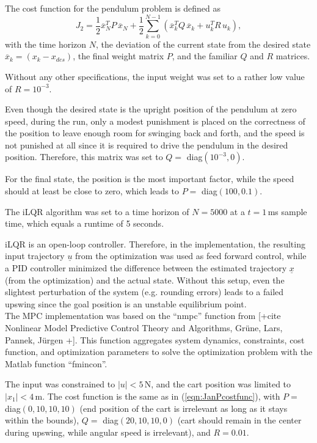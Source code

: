 \documentclass[letterpaper, 10 pt, conference]{ieeeconf}  %
\begin{document}
The cost function for the pendulum problem is defined as 
\begin{equation}\label{eqn:JanPcostfunc}
J_2 = \frac{1}{2}\overline{x}_N^{T}P\,\overline{x}_N + \frac{1}{2}\sum_{k=0}^{N-1}\left(\overline{x}_k^{T}Q\,\overline{x}_k + u_k^{T}R\,u_k\right),
\end{equation}
with the time horizon $N$, the deviation of the current state from the desired state $\overline{x}_k=(x_k-x_{des})$, the final weight matrix $P$, and the familiar $Q$ and $R$ matrices. 

Without any other specifications, the input weight was set to a rather low value of $R=10^{-3}$. 

Even though the desired state is the upright position of the pendulum at zero speed, during the run, only a modest punishment is placed on the correctness of the position to leave enough room for swinging back and forth, and the speed is not punished at all since it is required to drive the pendulum in the desired position. Therefore, this matrix was set to $Q=$ diag$(10^{-3},0)$.

For the final state, the position is the most important factor, while the speed should at least be close to zero, which leads to $P=$ diag$(100,0.1)$.

The iLQR algorithm was set to a time horizon of $N=5000$ at a $t=1$\,ms sample time, which equals a runtime of 5 seconds.

iLQR is an open-loop controller. Therefore, in the implementation, the resulting input trajectory $\underline{u}$ from the optimization was used as feed forward control, while a PID controller minimized the difference between the estimated trajectory $\underline{x}$ (from the optimization) and the actual state.
Without this setup, even the slightest perturbation of the system (e.g. rounding errors) leads to a failed upswing since the goal position is an unstable equilibrium point.\\

 

The MPC implementation was based on the ``nmpc'' function from [+cite Nonlinear Model Predictive Control Theory and Algorithms, Grüne, Lars, Pannek, Jürgen +]. This function aggregates system dynamics, constraints, cost function, and optimization parameters to solve the optimization problem with the Matlab function ``fmincon''.

The input was constrained to $|u|<5$\,N, and the cart position was limited to $|x_1|<4$\,m. The cost function is the same as in (\ref{eqn:JanPcostfunc}), with $P=$ diag$(0,10,10,10)$ (end position of the cart is irrelevant as long as it stays within the bounds), $Q=$ diag$(20,10,10,0)$ (cart should remain in the center during upswing, while angular speed is irrelevant), and $R=0.01$. 
\end{document}
